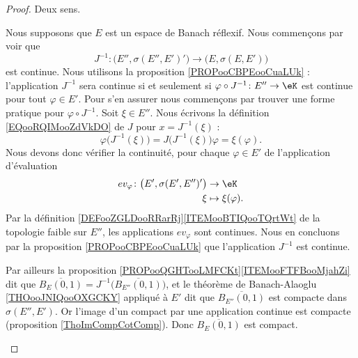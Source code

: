 \begin{proof}
	Deux sens.
	\begin{subproof}
		\spitem[\( \Rightarrow\)]
		Nous supposons que \( E\) est un espace de Banach réflexif. Nous commençons par voir que
		\begin{equation}
			J^{-1} \colon \big( E'',\sigma(E'',E')' \big)\to \big( E,\sigma(E,E') \big)
		\end{equation}
		est continue. Nous utilisons la proposition \ref{PROPooCBPEooCuaLUk} : l'application \( J^{-1}\) sera continue si et seulement si \( \varphi\circ J^{-1} \colon E''\to \eK    \) est continue pour tout \( \varphi\in E'\). Pour s'en assurer nous commençons par trouver une forme pratique pour \( \varphi\circ J^{-1}\). Soit \( \xi\in E''\). Nous écrivons la définition \eqref{EQooRQIMooZdVkDO} de \( J\) pour \( x=J^{-1}(\xi		)\) :
		\begin{equation}
			\varphi\big( J^{-1}(\xi) \big)=J\big( J^{-1}(\xi) \big)\varphi=\xi(\varphi).
		\end{equation}
		Nous devons donc vérifier la continuité, pour chaque \( \varphi\in E'\) de l'application d'évaluation
		\begin{equation}
			\begin{aligned}
				ev_{\varphi}\colon \big( E',\sigma(E',E'')' \big) & \to \eK               \\
				\xi                                               & \mapsto \xi(\varphi).
			\end{aligned}
		\end{equation}
		Par la définition \ref{DEFooZGLDooRRarRj}\ref{ITEMooBTIQooTQrtWt} de la topologie faible sur \( E''\), les applications \( ev_{\varphi}\) sont continues. Nous en concluons par la proposition \ref{PROPooCBPEooCuaLUk} que l'application \( J^{-1}\) est continue.

		Par ailleurs la proposition \ref{PROPooQGHTooLMFCKt}\ref{ITEMooFTFBooMjahZi} dit que \( \overline{B_E(0,1)}=J^{-1}\big( \overline{B_{E''}(0,1)} \big)\), et le théorème de Banach-Alaoglu \ref{THOooJNIQooOXGCKY} appliqué à \( E'\) dit que \( \overline{B_{E''}(0,1)}\) est compacte dans \( \sigma(E'', E')\). Or l'image d'un compact par une application continue est compacte (proposition \ref{ThoImCompCotComp}). Donc \( \overline{B_E(0,1)}\) est compact.


\end{subproof}
\end{proof}
